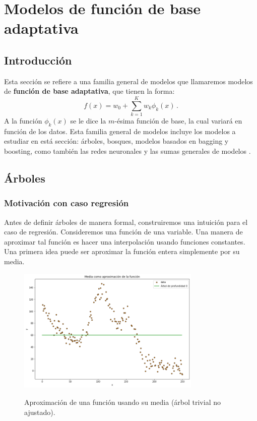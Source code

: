 \section{Modelos de función de base adaptativa}
\label{cap:adaptativa}

\subsection{Introducción}
\label{sec:intro_adap}

Esta sección se refiere a una familia general de modelos que llamaremos modelos de \textbf{función de base adaptativa}, que tienen la forma:
\begin{equation}
    f(x) = w_0 + \sum^K_{k=1} w_k \phi_k(x) \,. 
\end{equation}
A la función $\phi_k(x)$ se le dice la $m$-ésima función de base, la cual variará en función de los datos. Esta familia general de modelos incluye los modelos a estudiar en está sección: árboles, bosques, modelos basados en bagging y boosting, como también las redes neuronales y las sumas generales de modelos \cite{pml1Book}.


\subsection{Árboles}
\label{sec:arbol}

\subsubsection{Motivación con caso regresión}

Antes de definir árboles de manera formal, construiremos una intuición para el caso de regresión. Consideremos una función de una variable. Una manera de aproximar tal función es hacer una interpolación usando funciones constantes. Una primera idea puede ser aproximar la función entera simplemente por su media.

\begin{figure}[h]
	\centering
	\includegraphics[height=6cm]{img/capN_arbol_trivial.png}\\
	\caption{Aproximación de una función usando su media (árbol trivial no ajustado).}
\end{figure}

